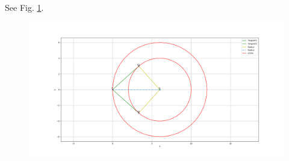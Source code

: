	\\
	\solution See Fig. 
		\ref{fig:10/11/2/2}.
	\begin{figure}[!ht]
		\centering
 \includegraphics[width=\columnwidth]{chapters/10/11/2/2/figs/main.png}
		\caption{}
		\label{fig:10/11/2/2}
  	\end{figure}

